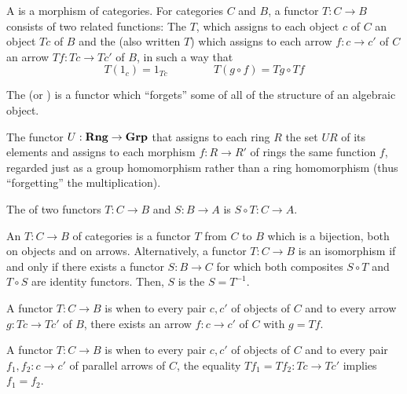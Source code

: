 \documentclass{mathnotes}
\newcommand{\cat}[1]{\text{\textbf{#1}}}
\begin{document}
\begin{bdefi}
  A  is a morphism of categories. For categories $C$ and $B$, a
  functor $T:C\rightarrow B$ consists of two related functions: The
   $T$, which assigns to each object $c$ of $C$ an
  object $Tc$ of $B$ and the  (also written $T$) which
  assigns to each arrow $f:c\rightarrow c'$ of $C$ an arrow $Tf:Tc\rightarrow
  Tc'$ of $B$, in such a way that
  \[T(1_c)=1_{Tc}\hspace{50pt} T(g\circ f)=Tg\circ Tf\]
\end{bdefi}

\begin{defi}
  The  (or ) is a functor
  which ``forgets'' some of all of the structure of an algebraic object.
\end{defi}

\begin{ex}
  The functor $U: \cat{Rng}\rightarrow\cat{Grp}$ that assigns to each ring $R$
  the set $UR$ of its elements and assigns to each morphism $f:R\rightarrow R'$
  of rings the same function $f$, regarded just as a group homomorphism rather
  than a ring homomorphism (thus ``forgetting'' the multiplication).
\end{ex}

\begin{defi}
  The  of two functors $T:C\rightarrow B$ and $S:B\rightarrow
  A$ is $S\circ T:C\rightarrow A$.
\end{defi}

\begin{defi}
  An  $T:C\rightarrow B$ of categories is a functor $T$
  from $C$ to $B$ which is a bijection, both on objects and on arrows.
  Alternatively, a functor $T:C\rightarrow B$ is an isomorphism if and only if
  there exists a functor $S:B\rightarrow C$ for which both composites $S\circ
  T$ and $T\circ S$ are identity functors. Then, $S$ is the  $S=T^{-1}$.
\end{defi}

\begin{defi}
  A functor $T:C\rightarrow B$ is  when to every pair $c, c'$ of
  objects of $C$ and to every arrow $g:Tc\rightarrow Tc'$ of $B$, there exists
  an arrow $f:c\rightarrow c'$ of $C$ with $g=Tf$.
\end{defi}

\begin{defi}
  A functor $T:C\rightarrow B$ is  when to every pair $c, c'$
  of objects of $C$ and to every pair $f_1,f_2:c\rightarrow c'$ of parallel
  arrows of $C$, the equality $Tf_1=Tf_2:Tc\rightarrow Tc'$ implies $f_1=f_2$.
\end{defi}
\end{document}
